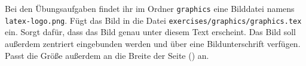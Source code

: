 Bei den Übungsaufgaben findet ihr im Ordner \texttt{graphics} eine Bilddatei namens \texttt{latex-logo.png}. Fügt das Bild in die Datei \texttt{exercises/graphics/graphics.tex} ein. Sorgt dafür, dass das Bild genau unter diesem Text erscheint. Das Bild soll außerdem zentriert eingebunden werden und über eine Bildunterschrift verfügen. Passt die Größe außerdem an die Breite der Seite (\texttt{\textwidth}) an.

